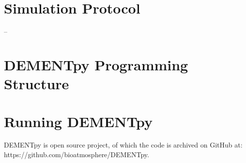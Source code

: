 \documentclass[12pt, oneside, titlepage]{article}      %
\begin{document}
\section{Simulation Protocol}
--

\section{DEMENTpy Programming Structure}




\section{Running DEMENTpy}

DEMENTpy is open source project, of which the code is archived on GitHub at: https://github.com/bioatmosphere/DEMENTpy.
\end{document}
